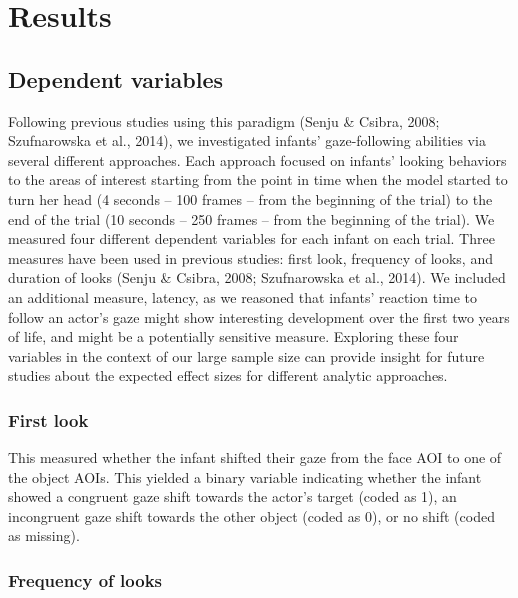 \documentclass[
  english,
  ,man,floatsintext]{apa6}
\begin{document}
\hypertarget{results}{%
\section{Results}\label{results}}

\hypertarget{dependent-variables}{%
\subsection{Dependent variables}\label{dependent-variables}}

Following previous studies using this paradigm (Senju \& Csibra, 2008; Szufnarowska et al., 2014), we investigated infants' gaze-following abilities via several different approaches. Each approach focused on infants' looking behaviors to the areas of interest starting from the point in time when the model started to turn her head (4 seconds -- 100 frames -- from the beginning of the trial) to the end of the trial (10 seconds -- 250 frames -- from the beginning of the trial). We measured four different dependent variables for each infant on each trial. Three measures have been used in previous studies: first look, frequency of looks, and duration of looks (Senju \& Csibra, 2008; Szufnarowska et al., 2014). We included an additional measure, latency, as we reasoned that infants' reaction time to follow an actor's gaze might show interesting development over the first two years of life, and might be a potentially sensitive measure. Exploring these four variables in the context of our large sample size can provide insight for future studies about the expected effect sizes for different analytic approaches.

\hypertarget{first-look}{%
\subsubsection{First look}\label{first-look}}

This measured whether the infant shifted their gaze from the face AOI to one of the object AOIs. This yielded a binary variable indicating whether the infant showed a congruent gaze shift towards the actor's target (coded as 1), an incongruent gaze shift towards the other object (coded as 0), or no shift (coded as missing).

\hypertarget{frequency-of-looks}{%
\subsubsection{Frequency of looks}\label{frequency-of-looks}}
\end{document}
